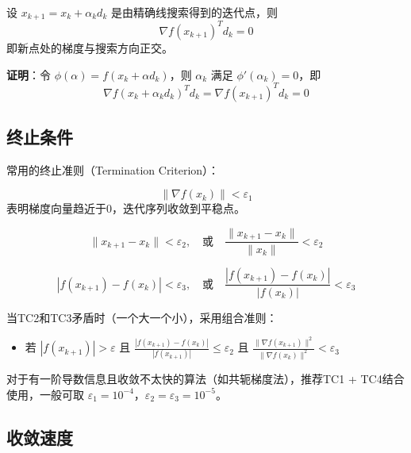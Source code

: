 \begin{theorem}[最优步长的正交性]
设 $x_{k+1} = x_k + \alpha_k d_k$ 是由精确线搜索得到的迭代点，则
\[
\nabla f(x_{k+1})^T d_k = 0
\]
即新点处的梯度与搜索方向正交。
\end{theorem}

\textbf{证明}：令 $\phi(\alpha) = f(x_k + \alpha d_k)$，则 $\alpha_k$ 满足 $\phi'(\alpha_k) = 0$，即
\[
\nabla f(x_k + \alpha_k d_k)^T d_k = \nabla f(x_{k+1})^T d_k = 0
\]

\subsection{终止条件}

常用的终止准则（Termination Criterion）：

\begin{conceptbox}[TC1：梯度准则]
\[
\|\nabla f(x_k)\| < \varepsilon_1
\]
表明梯度向量趋近于0，迭代序列收敛到平稳点。
\end{conceptbox}

\begin{conceptbox}[TC2：相邻迭代点准则]
\[
\|x_{k+1} - x_k\| < \varepsilon_2,\quad \text{或}\quad \frac{\|x_{k+1} - x_k\|}{\|x_k\|} < \varepsilon_2
\]
\end{conceptbox}

\begin{conceptbox}[TC3：函数值变化准则]
\[
|f(x_{k+1}) - f(x_k)| < \varepsilon_3,\quad \text{或}\quad \frac{|f(x_{k+1}) - f(x_k)|}{|f(x_k)|} < \varepsilon_3
\]
\end{conceptbox}

\begin{notebox}[Himmeblau终止准则（TC4）]
当TC2和TC3矛盾时（一个大一个小），采用组合准则：
\begin{itemize}
    \item 若 $|f(x_{k+1})| > \varepsilon$ 且 $\frac{|f(x_{k+1}) - f(x_k)|}{|f(x_{k+1})|} \leq \varepsilon_2$ 且 $\frac{\|\nabla f(x_{k+1})\|^2}{\|\nabla f(x_k)\|^2} < \varepsilon_3$
\end{itemize}

对于有一阶导数信息且收敛不太快的算法（如共轭梯度法），推荐TC1 + TC4结合使用，一般可取 $\varepsilon_1 = 10^{-4}$，$\varepsilon_2 = \varepsilon_3 = 10^{-5}$。
\end{notebox}

\subsection{收敛速度}

